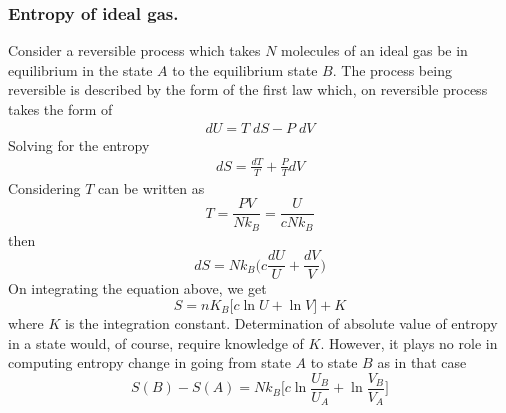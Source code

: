 \documentclass[../../../Main.tex]{subfiles}
\begin{document}
\subsubsection*{Entropy of ideal gas.} Consider a reversible process which takes $N$ molecules of an ideal gas be in equilibrium in the state $A$ to the equilibrium state $B$. The process being reversible is described by the form of the first law which, on reversible process takes the form of 
\begin{eqnarray}
    dU=T\;dS-P\;dV
\end{eqnarray}
Solving for the entropy
\begin{eqnarray}
    dS=\frac{dT}{T}+\frac{P}{T}dV
\end{eqnarray}
Considering $T$ can be written as
\begin{equation*}
    T=\frac{PV}{Nk_B}=\frac{U}{cNk_B}
\end{equation*}
then 
\begin{equation*}
    dS=Nk_B\biggl(c\frac{dU}{U}+\frac{dV}{V}\biggr)
\end{equation*}
On integrating the equation above, we get
\begin{equation*}
    S=nK_B\bigl[c\ln U+\ln V\bigr]+K
\end{equation*}
where $K$ is the integration constant. Determination of absolute value of entropy in a state would, of course, require knowledge of $K$. However, it plays no role in computing entropy change in going from state $A$ to state $B$ as in that case
\begin{equation*}
    S(B)-S(A)=Nk_B \biggl[c\ln\frac{U_B}{U_A}+\ln\frac{V_B}{V_A}\biggr]
\end{equation*}
\end{document}
